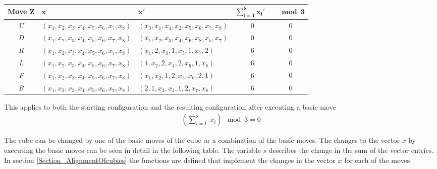 \documentclass[12pt,a4paper]{article}
\theoremstyle{custom}
\begin{document}
\begin{adjustbox}{width=1\textwidth,center}

\begin{tabular}{cllcc}
\toprule
\textbf{Move} $\boldsymbol{Z}$ & \hspace*{2.2cm}$\boldsymbol{x}$ & \hspace*{2cm} $\boldsymbol{x'}$ &  $\boldsymbol{\sum_{i= 1}^{8} x_i'} \ \ \ $ & $\boldsymbol{\mod 3}$ \\
\midrule

\textit{U} & $(x_1, x_2, x_3, x_4, x_5, x_6, x_7, x_8)$ & $(x_3, x_1, x_4, x_2, x_5, x_6, x_7, x_8)$ & 0 & 0 \\
\textit{D} & $(x_1, x_2, x_3, x_4, x_5, x_6, x_7, x_8)$ & $(x_1, x_2, x_3, x_4, x_6, x_8, x_5, x_7)$ & 0 & 0 \\

\textit{R} & $(x_1, x_2, x_3, x_4, x_5, x_6, x_7, x_8)$ & $(x_1, 2, x_3, 1, x_5, 1, x_7, 2)$ & 6 & 0 \\

\textit{L} & $(x_1, x_2, x_3, x_4, x_5, x_6, x_7, x_8)$ & $(1, x_2, 2, x_4, 2, x_6, 1, x_8)$ & 6 & 0 \\
\textit{F} & $(x_1, x_2, x_3, x_4, x_5, x_6, x_7, x_8)$ & $(x_1, x_2, 1, 2, x_5, x_6, 2, 1)$ & 6 & 0 \\
\textit{B} & $(x_1, x_2, x_3, x_4, x_5, x_6, x_7, x_8)$ & $(2, 1, x_3, x_4, 1, 2, x_7, x_8)$ & 6 & 0 \\
\bottomrule
\end{tabular}
\end{adjustbox}

\vspace{1cm}
This applies to both the starting configuration and the resulting configuration after executing a basic move
\begin{align*}
(\sum_{i= 1}^{8} \ x_i) \mod 3 = 0
\end{align*}


The cube can be changed by one of the basic moves of the cube or a combination of the basic moves. The changes to the vector $x$ by executing the basic moves can be seen in detail in the following table. The variable $s$ describes the change in the sum of the vector entries. In section \ref{Section_AlignmentOfcubies} the functions are defined that implement the changes in the vector $x$ for each of the moves.
\ \\
\end{document}
